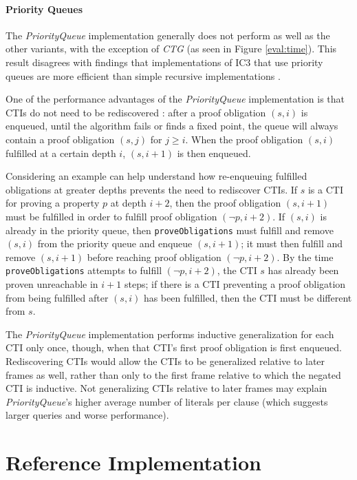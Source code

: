 \documentclass[12pt,a4paper,twoside,openright]{report}
\begin{document}
{{\paragraph{Priority Queues}{
The \emph{PriorityQueue} implementation generally does not perform as well as the
other variants, with the exception of \emph{CTG} (as seen in Figure \ref{eval:time}).
This result disagrees with findings that implementations of IC3 that
use priority queues are more efficient than simple recursive implementations
\cite{een11,griggio14}.

One of the performance advantages of the \emph{PriorityQueue} implementation is that CTIs do not need
to be rediscovered \cite{een11}: after a proof obligation $(s,i)$ is enqueued, until the algorithm fails or finds a fixed point,
the queue will always contain a proof obligation $(s,j)$ for $j \geq i$. When the proof obligation $(s,i)$
fulfilled at a certain depth $i$, $(s,i + 1)$ is then enqueued.

Considering an example can help understand how re-enqueuing fulfilled obligations at
greater depths prevents the need to rediscover CTIs.
If $s$ is a CTI for proving a property
$p$ at depth $i + 2$, then the proof obligation $(s, i+1)$ must be fulfilled
in order to fulfill proof obligation $(\neg p, i+2)$. If $(s,i)$ is already
in the priority queue, then \verb,proveObligations, must fulfill and
remove $(s,i)$ from the
priority queue and enqueue $(s, i + 1)$; it must then fulfill and remove $(s, i + 1)$ before
reaching proof obligation $(\neg p, i + 2)$. By the time \verb,proveObligations,
attempts to fulfill $(\neg p, i + 2)$, the CTI $s$ has already been proven
unreachable in $i + 1$ steps; if there is a CTI preventing a proof obligation
from being fulfilled after $(s,i)$ has been fulfilled, then the CTI must be different
from $s$.

The \emph{PriorityQueue} implementation performs inductive generalization for each CTI only once, though,
when that CTI's first proof obligation is first enqueued. Rediscovering CTIs would allow the CTIs to
be generalized relative to later frames as well, rather than only to the first frame relative to which
the negated CTI is inductive. Not generalizing CTIs relative to later frames may
explain \emph{PriorityQueue}'s higher average number of
literals per clause (which suggests larger queries and worse performance).
}

\section{Reference Implementation}
\label{eval:ic3ref}

}}
\end{document}
